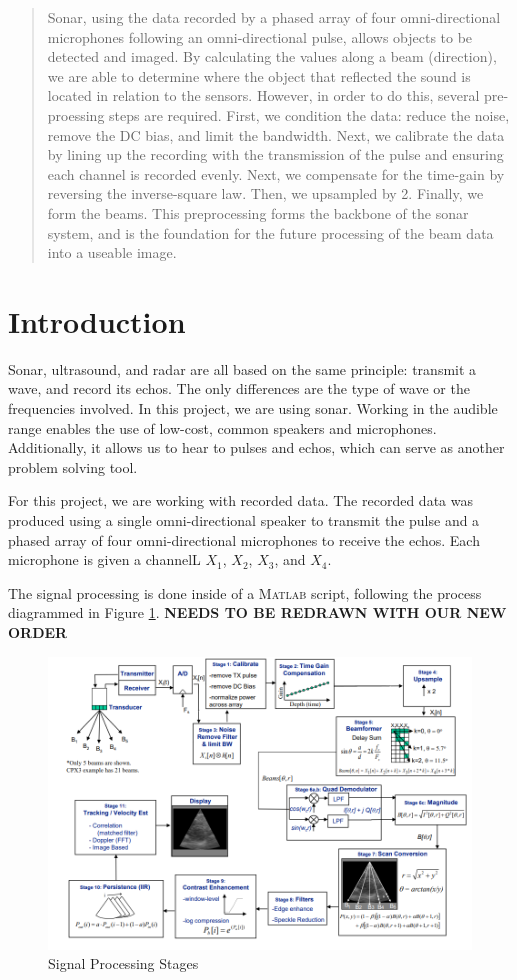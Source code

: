 

\begin{abstract}

Sonar, using the data recorded by a phased array of four omni-directional microphones following an omni-directional pulse, allows objects to be detected and imaged.  By calculating the values along a beam (direction), we are able to determine where the object that reflected the sound is located in relation to the sensors.  However, in order to do this, several pre-proessing steps are required.  First, we condition the data: reduce the noise, remove the DC bias, and limit the bandwidth.  Next, we calibrate the data by lining up the recording with the transmission of the pulse and ensuring each channel is recorded evenly.  Next, we compensate for the time-gain by reversing the inverse-square law.  Then, we upsampled by 2.  Finally, we form the beams.  This preprocessing forms the backbone of the sonar system, and is the foundation for the future processing of the beam data into a useable image.


\end{abstract}

\section{Introduction}

Sonar, ultrasound, and radar are all based on the same principle: transmit a wave, and record its echos.  The only differences are the type of wave or the frequencies involved.  In this project, we are using sonar.  Working in the audible range enables the use of low-cost, common speakers and microphones.  Additionally, it allows us to hear to pulses and echos, which can serve as another problem solving tool.

For this project, we are working with recorded data.  The recorded data was produced using a single omni-directional speaker to transmit the pulse and a phased array of four omni-directional microphones to receive the echos.  Each microphone is given a channelL $X_1$, $X_2$, $X_3$, and $X_4$.

The signal processing is done inside of a \textsc{Matlab} script, following the process diagrammed in Figure \ref{fig:stages}. \textbf{NEEDS TO BE REDRAWN WITH OUR NEW ORDER}

\begin{figure}[H]
    \centering
    \includegraphics[width=0.75\linewidth]{figures/stages.png}
    \caption{Signal Processing Stages}
    \label{fig:stages}
\end{figure}
